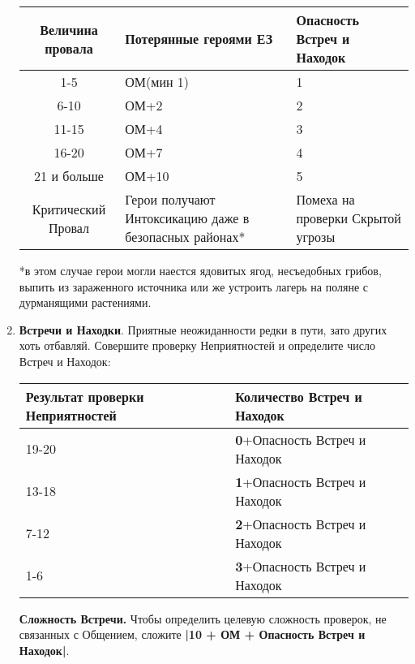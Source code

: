 \begin{enumerate}
\begin{center}
\begin{tabular}{|c|p{5cm}|p{5cm}|}
\hline
Величина провала & Потерянные героями ЕЗ & Опасность Встреч и Находок \\ \hline
1-5 & ОМ(мин 1) & 1 \\ \hline
6-10 & ОМ+2 & 2 \\ \hline
11-15 & ОМ+4 & 3 \\ \hline
16-20 & ОМ+7 & 4 \\ \hline
21 и больше & ОМ+10 & 5 \\ \hline
Критический Провал & Герои получают Интоксикацию даже в безопасных районах* & Помеха на проверки Скрытой угрозы \\ \hline
\end{tabular}
\end{center}
*в этом случае герои могли наестся ядовитых ягод, несъедобных грибов, выпить из зараженного источника или же устроить лагерь на поляне с дурманящими растениями.
\item \textbf{Встречи и Находки}. Приятные неожиданности редки в пути, зато других хоть отбавляй. Совершите проверку Неприятностей и определите число Встреч и Находок:
\begin{center}
\begin{tabular}{ |p{2.7cm}|p{12cm}| }
\hline
\textbf{Результат проверки Неприятностей} & \textbf{Количество Встреч и Находок}
\\ \hline
19-20 & \textbf{0}+Опасность Встреч и Находок
\\ \hline
13-18 & \textbf{1}+Опасность Встреч и Находок
\\ \hline
7-12 & \textbf{2}+Опасность Встреч и Находок
\\ \hline
1-6 & \textbf{3}+Опасность Встреч и Находок
\\ \hline
\end{tabular}
\end{center}
\textbf{Сложность Встречи.} Чтобы определить целевую сложность проверок, не связанных с Общением, сложите \textbf{|10 + ОМ + Опасность Встреч и Находок|}.


\end{enumerate}
